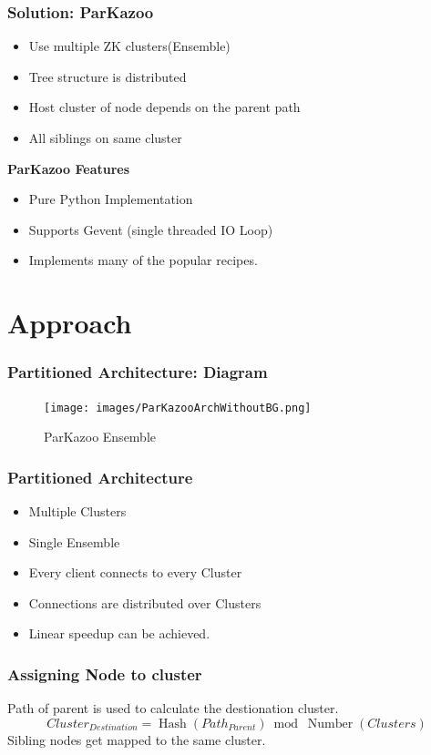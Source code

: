 \documentclass[10pt, compress]{beamer}
\DeclareMathOperator{\Hash}{Hash}
\DeclareMathOperator{\Number}{Number}
\begin{document}
\begin{frame}[fragile]
    \frametitle{Solution: ParKazoo}
    \begin{itemize}
        \item Use multiple ZK clusters(Ensemble)
        \item Tree structure is distributed
        \item Host cluster of node depends on the parent path
        \item All siblings on same cluster
    \end{itemize}
    

    \textbf{ParKazoo Features}
    \begin{itemize}
        \item Pure Python Implementation
        \item Supports Gevent (single threaded IO Loop)
        \item Implements many of the popular recipes.
    \end{itemize}
\end{frame}

\section{Approach}
\begin{frame}[fragile]
    \frametitle{Partitioned Architecture: Diagram}
    \begin{figure}[ht!]
        \centering
        \texttt{[image: images/ParKazooArchWithoutBG.png]}
        \caption{ParKazoo Ensemble \label{overflow}}
    \end{figure}
\end{frame}

\begin{frame}[fragile]
    \frametitle{Partitioned Architecture}
    \begin{itemize}
        \item Multiple Clusters
        \item Single Ensemble
        \item Every client connects to every Cluster
        \item Connections are distributed over Clusters
        \item Linear speedup can be achieved.
    \end{itemize}
\end{frame}

\begin{frame}[fragile]
    \frametitle{Assigning Node to cluster}
    Path of parent is used to calculate the destionation cluster.
    \begin{equation}
        Cluster_{Destination} = \Hash(Path_{Parent})\bmod \Number(Clusters)
    \end{equation}
    Sibling nodes get mapped to the same cluster.
\end{frame}
\end{document}
